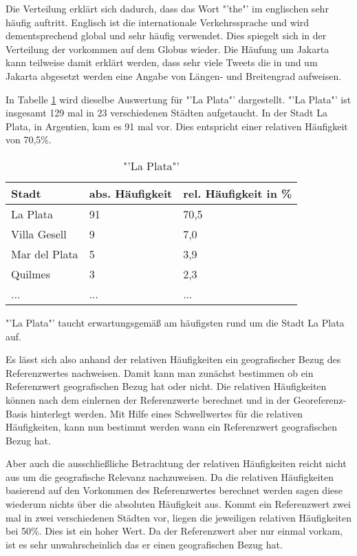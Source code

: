 				Die Verteilung erklärt sich dadurch, dass das Wort "'the"' im englischen sehr häufig auftritt.
				Englisch ist die internationale Verkehrssprache und wird dementsprechend global und sehr häufig verwendet.
				Dies spiegelt sich in der Verteilung der vorkommen auf dem Globus wieder.
				Die Häufung um Jakarta kann teilweise damit erklärt werden, dass sehr viele Tweets die in und um Jakarta abgesetzt werden eine Angabe von Längen- und Breitengrad aufweisen. 

				In Tabelle \ref{tab:laPlata} wird dieselbe Auswertung für "'La Plata"' dargestellt. 
				"'La Plata"' ist insgesamt 129 mal in 23 verschiedenen Städten aufgetaucht. 
				In der Stadt La Plata, in Argentien, kam es 91 mal vor.
				Dies entspricht einer relativen Häufigkeit von 70,5\%.

				\begin{table}[h]
				\centering
				\caption{"'La Plata"'}
				\label{tab:laPlata}
				\begin{tabular}{|l|l|l|}
				\hline
				Stadt            & abs. Häufigkeit & rel. Häufigkeit in \% \\ \hline \hline
				La Plata         & 91              & 70,5                      \\ \hline
				Villa Gesell     & 9               & 7,0                       \\ \hline
				Mar del Plata    & 5               & 3,9                       \\ \hline
				Quilmes          & 3               & 2,3                       \\ \hline
				... & ... & ... \\ \hline
				\end{tabular}
				\end{table}

				"'La Plata"' taucht erwartungsgemäß am häufigsten rund um die Stadt La Plata auf.  

				Es lässt sich also anhand der relativen Häufigkeiten ein geografischer Bezug des Referenzwertes nachweisen.
				Damit kann man zunächst bestimmen ob ein Referenzwert geografischen Bezug hat oder nicht.
				Die relativen Häufigkeiten können nach dem einlernen der Referenzwerte berechnet und in der Georeferenz-Basis hinterlegt werden.
				Mit Hilfe eines Schwellwertes für die relativen Häufigkeiten, kann nun bestimmt werden wann ein Referenzwert geografischen Bezug hat.

				Aber auch die ausschließliche Betrachtung der relativen Häufigkeiten reicht nicht aus um die geografische Relevanz nachzuweisen.
				Da die relativen Häufigkeiten basierend auf den Vorkommen des Referenzwertes berechnet werden sagen diese wiederum nichts über die absoluten Häufigkeit aus. 
				Kommt ein Referenzwert zwei mal in zwei verschiedenen Städten vor, liegen die jeweiligen relativen Häufigkeiten bei 50\%.
				Dies ist ein hoher Wert.
				Da der Referenzwert aber nur einmal vorkam, ist es sehr unwahrscheinlich das er einen geografischen Bezug hat.  

